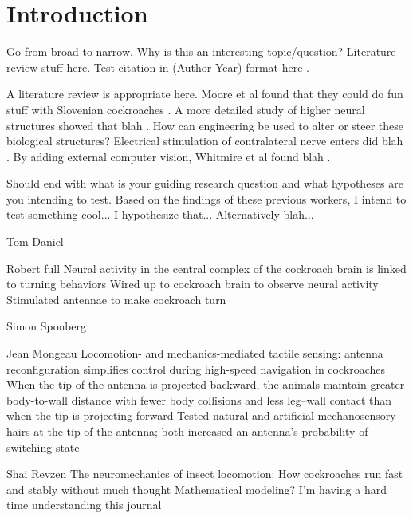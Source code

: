 \section{Introduction}
Go from broad to narrow. Why is this an interesting topic/question? Literature review stuff here. Test citation in (Author Year) format here \citep{buck2020go}. 

A literature review is appropriate here. Moore et al found that they could do fun stuff with Slovenian cockroaches \citep{moore1998directed}. A more detailed study of higher neural structures showed that blah \citep{guo2013neural}. How can engineering be used to alter or steer these biological structures? Electrical stimulation of contralateral nerve enters did blah \citep{holzer1997locomotion}. By adding external computer vision, Whitmire et al found blah \citep{whitmire2013kinect}. 

Should end with what is your guiding research question and what hypotheses are you intending to test. Based on the findings of these previous workers, I intend to test something cool... I hypothesize that... Alternatively blah... 







Tom Daniel

Robert full
Neural activity in the central complex of the cockroach brain is linked to turning behaviors 
Wired up to cockroach brain to observe neural activity
Stimulated antennae to make cockroach turn

Simon Sponberg

Jean Mongeau
Locomotion- and mechanics-mediated tactile sensing: antenna reconfiguration simplifies control during high-speed navigation in cockroaches
When the tip of the antenna is projected backward, the animals maintain greater body-to-wall distance with fewer body collisions and less leg–wall contact than when the tip is projecting forward
Tested natural and artificial mechanosensory hairs at the tip of the antenna; both  increased an antenna's probability of switching state

Shai Revzen
The neuromechanics of insect locomotion: How cockroaches run fast and stably without much thought
Mathematical modeling? I’m having a hard time understanding this journal

